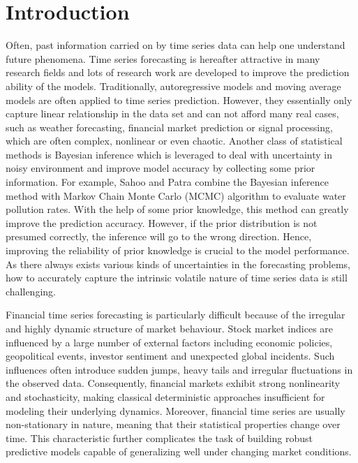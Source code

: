\chapter{Introduction}\label{intro}

Often, past information carried on by time series data can help one understand future phenomena. Time series forecasting is hereafter attractive in many research fields and lots of research work are developed to improve the prediction ability of the models. Traditionally, autoregressive models and moving average models are often applied to time series prediction. However, they essentially only capture linear relationship in the data set and can not afford many real cases, such as weather forecasting, financial market prediction or signal processing, which are often complex, nonlinear or even chaotic. Another class of statistical methods is Bayesian inference which is leveraged to deal with uncertainty in noisy environment and improve model accuracy by collecting some prior information. For example, Sahoo and Patra \cite{Sahoo18092020} combine the Bayesian inference method with Markov Chain Monte Carlo (MCMC) algorithm to evaluate water pollution rates. With the help of some prior knowledge, this method can greatly improve the prediction accuracy. However, if the prior distribution is not presumed correctly, the inference will go to the wrong direction. Hence, improving the reliability of prior knowledge is crucial to the model performance. As there always exists various kinds of uncertainties in the forecasting problems, how to accurately capture the intrinsic volatile nature of time series data is still challenging.

Financial time series forecasting is particularly difficult because of the irregular and highly dynamic structure of market behaviour. Stock market indices are influenced by a large number of external factors including economic policies, geopolitical events, investor sentiment and unexpected global incidents. Such influences often introduce sudden jumps, heavy tails and irregular fluctuations in the observed data. Consequently, financial markets exhibit strong nonlinearity and stochasticity, making classical deterministic approaches insufficient for modeling their underlying dynamics. Moreover, financial time series are usually non-stationary in nature, meaning that their statistical properties change over time. This characteristic further complicates the task of building robust predictive models capable of generalizing well under changing market conditions.

